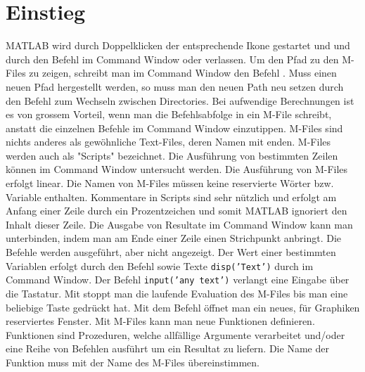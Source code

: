 \section{Einstieg}
MATLAB wird durch Doppelklicken der entsprechende Ikone gestartet und und durch den Befehl im Command Window  oder  verlassen.
\newline\newline
Um den Pfad zu den M-Files zu zeigen, schreibt man im Command Window den Befehl . Muss einen neuen Pfad hergestellt werden, so muss man den neuen Path neu setzen durch den Befehl  zum Wechseln zwischen Directories. Bei aufwendige Berechnungen ist es von grossem Vorteil, wenn man die Befehlsabfolge in ein M-File schreibt, anstatt die einzelnen Befehle im Command Window einzutippen.
\newline\newline
M-Files sind nichts anderes als gewöhnliche Text-Files, deren Namen mit  enden. M-Files werden auch als "Scripts" bezeichnet. Die Ausführung von bestimmten Zeilen können im Command Window untersucht werden. Die Ausführung von M-Files erfolgt linear. Die Namen von M-Files müssen keine reservierte Wörter bzw. Variable enthalten.
\newline\newline
Kommentare in Scripts sind sehr nützlich und erfolgt am Anfang einer Zeile durch ein Prozentzeichen \boxed{\textbf{\texttt{\%}}} und somit MATLAB ignoriert den Inhalt dieser Zeile. Die Ausgabe von Resultate im Command Window kann man unterbinden, indem man am Ende einer Zeile einen Strichpunkt \boxed{\textbf{\texttt{;}}} anbringt. Die Befehle werden ausgeführt, aber nicht angezeigt. Der Wert einer bestimmten Variablen erfolgt durch den Befehl  sowie Texte {\color{red}\texttt{disp('Text')}} durch im Command Window. Der Befehl {\color{red}\texttt{input('any text')}} verlangt eine Eingabe über die Tastatur. Mit  stoppt man die laufende Evaluation des M-Files bis man eine beliebige Taste gedrückt hat. Mit dem Befehl  öffnet man ein neues, für Graphiken reserviertes Fenster.
\newline\newline
Mit M-Files kann man neue Funktionen definieren. Funktionen sind Prozeduren, welche allfällige Argumente verarbeitet und/oder eine Reihe von Befehlen ausführt um ein Resultat zu liefern. Die Name der Funktion muss mit der Name des M-Files übereinstimmen.
